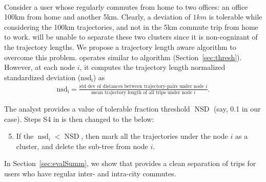 \paragraph{\lthAware}

Consider a user whose regularly commutes from home to two offices: an office \unit{100}{km} from home and another \unit{5}{km}. Clearly, a deviation of $\unit{1}{km}$ is tolerable while considering the \unit{100}{km} trajectories, and not in the \unit{5}{km} commute trip from home to work. \thresh will be unable to separate these two clusters since it is non-cognizant of the trajectory lengths. We propose a trajectory length aware algorithm \lthAware to overcome this problem. \lthAware operates similar to \thresh algorithm (Section~\ref{sec:thresh}). However, at each node $i$, it computes the trajectory length normalized standardized deviation ($\operatorname{nsd_i}$) as
\begin{align}
	\operatorname{nsd_i}=\frac{\text{std dev of distances between trajectory-pairs under node }i}{\text{mean trajectory length of all trips under node }i}.
\end{align}

The analyst provides a value of tolerable fraction threshold $\operatorname{NSD}$ (say, 0.1 in our case). Steps S4 in \thresh is then changed to the below:
\begin{enumerate}[label=S\arabic*:]
\setcounter{enumi}{4}
\item If the $\operatorname{nsd}_i < \operatorname{NSD}$, then mark all the trajectories under the node $i$ as a cluster, and delete the sub-tree from node $i$.
\end{enumerate}

In Section~\ref{sec:evalSumm}, we show that \lthAware provides a clean separation of trips for users who have regular inter- and intra-city commutes. 

